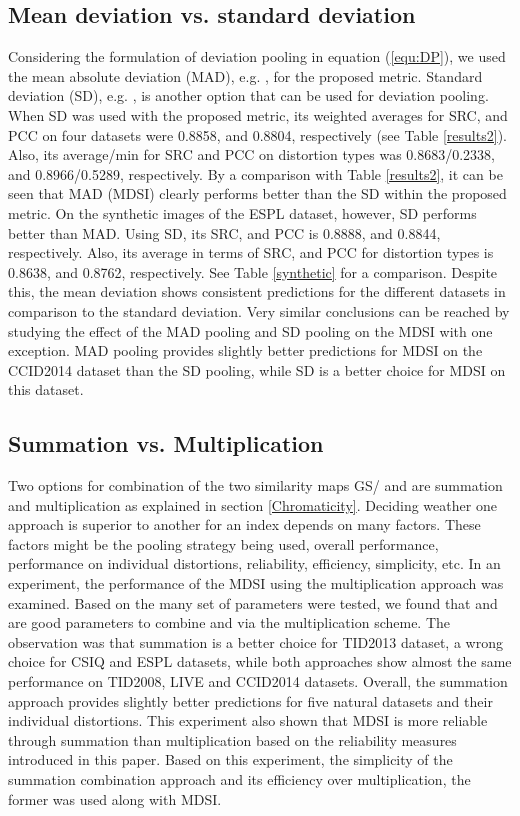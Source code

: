 \subsection{Mean deviation vs. standard deviation}
\label{vs1}

Considering the formulation of deviation pooling in equation (\ref{equ:DP}), we used the mean absolute deviation (MAD), e.g. , for the proposed metric. Standard deviation (SD), e.g. , is another option that can be used for deviation pooling. When SD was used with the proposed metric, its weighted averages for SRC, and PCC on four datasets were 0.8858, and 0.8804, respectively (see Table \ref{results2}). Also, its average/min for SRC and PCC on distortion types was 0.8683/0.2338, and 0.8966/0.5289, respectively. By a comparison with Table \ref{results2}, it can be seen that MAD (MDSI) clearly performs better than the SD within the proposed metric. On the synthetic images of the ESPL dataset, however, SD performs better than MAD. Using SD, its SRC, and PCC is 0.8888, and 0.8844, respectively. Also, its average in terms of SRC, and PCC for distortion types is 0.8638, and 0.8762, respectively. See Table \ref{synthetic} for a comparison. Despite this, the mean deviation shows consistent predictions for the different datasets in comparison to the standard deviation. Very similar conclusions can be reached by studying the effect of the MAD pooling and SD pooling on the MDSI with one exception. MAD pooling provides slightly better predictions for MDSI on the CCID2014 dataset than the SD pooling, while SD is a better choice for MDSI on this dataset.        


\subsection{Summation vs. Multiplication}
\label{vs2}
    
Two options for combination of the two similarity maps GS/ and  are summation and multiplication as explained in section \ref{Chromaticity}. Deciding weather one approach is superior to another for an index depends on many factors. These factors might be the pooling strategy being used, overall performance, performance on individual distortions, reliability, efficiency, simplicity, etc. In an experiment, the performance of the MDSI using the multiplication approach was examined. Based on the many set of parameters were tested, we found that  and  are good parameters to combine  and  via the multiplication scheme. The observation was that summation is a better choice for TID2013 dataset, a wrong choice for CSIQ and ESPL datasets, while both approaches show almost the same performance on TID2008, LIVE and CCID2014 datasets. Overall, the summation approach provides slightly better predictions for five natural datasets and their individual distortions. This experiment also shown that MDSI is more reliable through summation than multiplication based on the reliability measures introduced in this paper. Based on this experiment, the simplicity of the summation combination approach and its efficiency over multiplication, the former was used along with MDSI.







